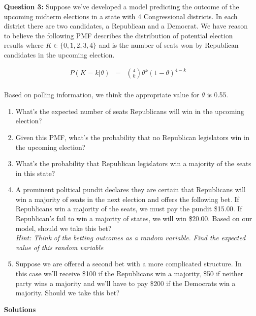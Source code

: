 \documentclass[11pt]{article}
\begin{document}
\textbf{Question 3:}
Suppose we've developed a model predicting the outcome of the upcoming midterm elections in a state with 4 Congressional districts. In each district there are two candidates, a Republican and a Democrat. We have reason to believe the following PMF describes the distribution of potential election results where $K \in \{0,1,2,3,4\}$ and is the number of seats won by Republican candidates in the upcoming election. 

\begin{eqnarray*}
P(K=k | \theta) &=& \binom{4}{k} \theta^{k} (1-\theta)^{4-k}\\
\end{eqnarray*}

Based on polling information, we think the appropriate value for $\theta$ is 0.55. 

\begin{enumerate}
\item What's the expected number of seats Republicans will win in the upcoming election? 
\item Given this PMF, what's the probability that no Republican legislators win in the upcoming election?
\item What's the probability that Republican legislators win a majority of the seats in this state?
\item A prominent political pundit declares they are certain that Republicans will win a majority of seats in the next election and offers the following bet. If Republicans win a majority of the seats, we must pay the pundit \$15.00. If Republican's fail to win a majority of states, we will win \$20.00. Based on our model, should we take this bet?\\
 \textit{Hint: Think of the betting outcomes as a random variable. Find the expected value of this random variable}
\item Suppose we are offered a second bet with a more complicated structure. In this case we'll receive \$100 if the Republicans win a majority, \$50 if neither party wins a majority and we'll have to pay \$200 if the Democrats win a majority. Should we take this bet?
\end{enumerate}

\bigskip

\textbf{Solutions}
\end{document}
